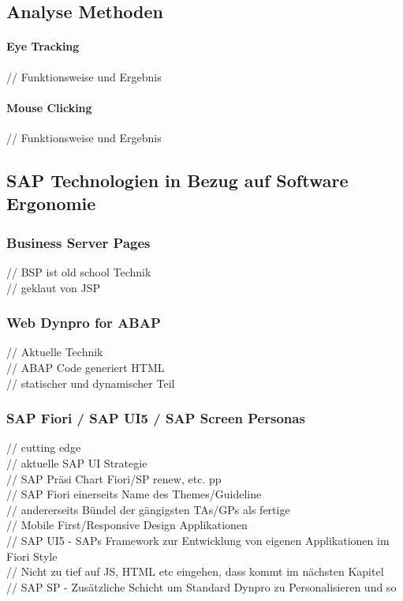\documentclass[12pt,a4paper,bibliography=totocnumbered,listof=totocnumbered]{scrartcl}
\begin{document}
\subsection{Analyse Methoden}
\paragraph{Eye Tracking}
// Funktionsweise und Ergebnis\\

\paragraph{Mouse Clicking}
// Funktionsweise und Ergebnis\\

\subsection{SAP Technologien in Bezug auf Software Ergonomie}
\subsubsection{Business Server Pages}
// \ac{BSP} ist old school Technik\\
// geklaut von \ac{JSP}\\

\subsubsection{Web Dynpro for ABAP}
// Aktuelle Technik\\
// ABAP Code generiert HTML\\
// statischer und dynamischer Teil\\

\subsubsection{SAP Fiori / SAP UI5 / SAP Screen Personas}
// cutting edge\\
// aktuelle SAP UI Strategie\\
// SAP Präsi Chart Fiori/SP renew, etc. pp\\
// SAP Fiori einerseits Name des Themes/Guideline\\
// andererseits Bündel der gängigsten TAs/GPs als fertige\\
// Mobile First/Responsive Design Applikationen\\
// SAP UI5 - SAPs Framework zur Entwicklung von eigenen Applikationen im Fiori Style\\
// Nicht zu tief auf JS, HTML etc eingehen, dass kommt im nächsten Kapitel\\
// SAP SP - Zusätzliche Schicht um Standard Dynpro zu Personalisieren und so\\
\pagebreak
\end{document}
